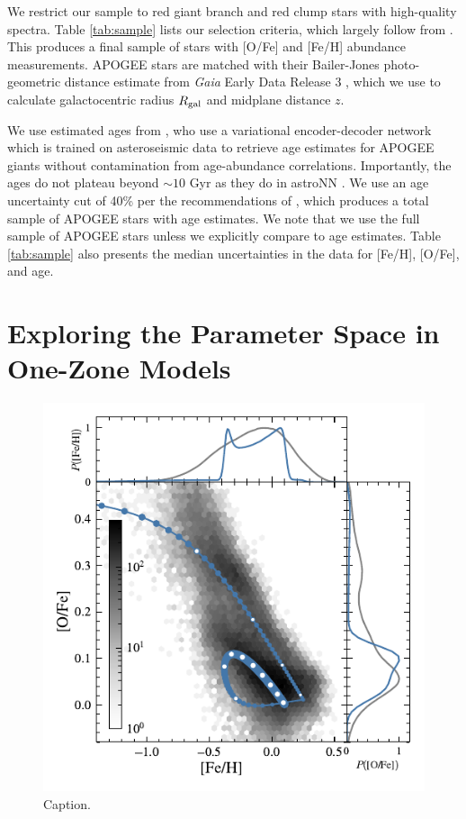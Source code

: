 \documentclass[twocolumn,twocolappendix,linenumbers]{aastex631}
\begin{document}
We restrict our sample to red giant branch and red clump stars with high-quality spectra. Table \ref{tab:sample} lists our selection criteria, which largely follow from \citet{Hayden2015-ChemicalCartography}. This produces a final sample of stars with [O/Fe] and [Fe/H] abundance measurements. APOGEE stars are matched with their Bailer-Jones photo-geometric distance estimate from \textit{Gaia} Early Data Release 3 \citep{gaia_collaboration_gaia_2016,gaia_collaboration_gaia_2021}, which we use to calculate galactocentric radius $R_{\rm gal}$ and midplane distance $z$.

We use estimated ages from \citet[][hereafter ]{leung_variational_2023}, who use a variational encoder-decoder network which is trained on asteroseismic data to retrieve age estimates for APOGEE giants without contamination from age-abundance correlations. Importantly, the  ages do not plateau beyond $\sim10$ Gyr as they do in astroNN \citep{Mackereth2019-astroNN-Ages}. We use an age uncertainty cut of 40\% per the recommendations of , which produces a total sample of APOGEE stars with age estimates. We note that we use the full sample of APOGEE stars unless we explicitly compare to age estimates. Table \ref{tab:sample} also presents the median uncertainties in the data for [Fe/H], [O/Fe], and age.

\section{Exploring the Parameter Space in One-Zone Models}
\label{sec:onezone-results}

\begin{figure}
    \centering
    \includegraphics{figures/onezone_sfr.pdf}
    \caption{Caption.}
    \label{fig:onezone-sfr}
\end{figure}
\end{document}

